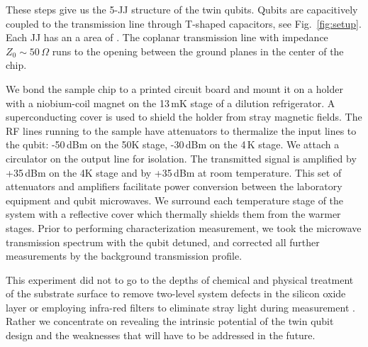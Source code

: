 These steps give us the 5-JJ structure of  the twin qubits. Qubits are capacitively coupled to
the transmission line through T-shaped capacitors, see Fig.~\ref{fig:setup}.  Each JJ has an a
area   of   .    The   coplanar  transmission   line   with   impedance
$ Z_{0} \sim 50\,\Omega $ runs to the opening between the ground planes in the center of the chip.


We  bond the  sample  chip  to a  printed  circuit board  and  mount it  on  a  holder with  a
niobium-coil magnet on  the 13\,mK stage of a dilution  refrigerator.  A superconducting cover
is used to  shield the holder from stray  magnetic fields. The RF lines running  to the sample
have  attenuators to  thermalize the  input lines  to the  qubit: -50\,dBm  on the  50K stage,
-30\,dBm on  the 4\,K  stage. We attach  a circulator  on the output  line for  isolation. The
transmitted  signal  is amplified  by  +35\,dBm  on  the 4K  stage  and  by +35\,dBm  at  room
temperature.  This set  of attenuators and amplifiers facilitate power  conversion between the
laboratory equipment and  qubit microwaves.  We surround each temperature  stage of the system
with  a reflective  cover which  thermally  shields them  from  the warmer  stages.  Prior  to
performing characterization measurement, we took  the microwave transmission spectrum with the
qubit detuned, and corrected all further measurements by the background transmission profile.

This  experiment did  not to  go  to the  depths of  chemical  and physical  treatment of  the
substrate  surface   to  remove  two-level   system  defects   in  the  silicon   oxide  layer
\cite{earnest2018} or employing infra-red filters  to eliminate stray light during measurement
\cite{barends2011}. Rather  we concentrate on  revealing the  intrinsic potential of  the twin
qubit design and the weaknesses that will have to be addressed in the future.

